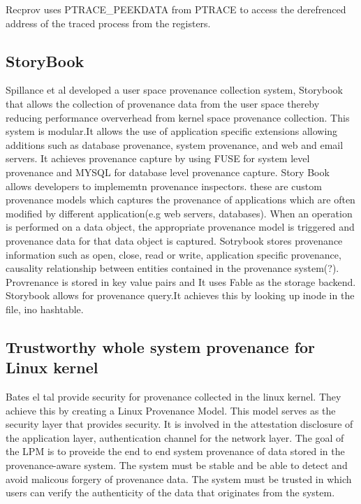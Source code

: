 Recprov uses PTRACE\_PEEKDATA from PTRACE to access the derefrenced address of the traced process from the registers.

\subsection{StoryBook}
Spillance et al developed a user space provenance collection system, Storybook \cite{Rabinovich1995}  that allows the collection of provenance data from the user space thereby reducing performance oververhead from kernel space provenance collection. This system is modular.It allows the use of application specific extensions allowing additions such as database provenance, system provenance, and web and email servers. It achieves provenance capture by using FUSE for system level provenance and MYSQL for database level provenance capture. Story Book allows developers to implememtn provenance inspectors. these are custom provenance models which captures the provenance of applications which are often modified by different application(e.g web servers, databases). When an operation is performed on a data object, the appropriate provenance model is triggered and provenance data for that data object is captured. Sotrybook stores provenance information such as open, close, read or write, application specific provenance, causality relationship between entities contained in the provenance system(?). Provrenance is stored in key value pairs and It uses Fable as the storage backend. Storybook allows for provenance query.It achieves this by looking up inode in the file, ino hashtable.

\subsection{Trustworthy whole system provenance for Linux kernel}

Bates el tal provide security for provenance collected in the linux kernel. They achieve this by creating a Linux Provenance Model. This model serves as the security layer that provides security. It is involved in the attestation disclosure of the application layer, authentication channel for the network layer.
The goal of the LPM is to proveide the end to end system provenance of data stored in the provenance-aware system. The system must be stable and be able to detect and avoid malicous forgery of provenance data. The system must be trusted in which users can verify the authenticity of the data that originates from the system.

